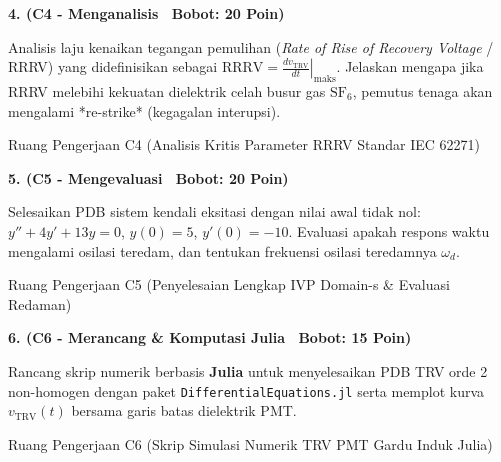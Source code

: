 \documentclass[10pt,a4paper]{article}
\begin{document}
\noindent\textbf{4. (C4 - Menganalisis \textbar\ Bobot: 20 Poin)}\par\vspace{0.5mm}
{\footnotesize Analisis laju kenaikan tegangan pemulihan (\textit{Rate of Rise of Recovery Voltage} / RRRV) yang didefinisikan sebagai $\text{RRRV} = \left. \frac{dv_{\text{TRV}}}{dt} \right|_{\text{maks}}$. Jelaskan mengapa jika RRRV melebihi kekuatan dielektrik celah busur gas $\text{SF}_6$, pemutus tenaga akan mengalami *re-strike* (kegagalan interupsi).}
\begin{answerbox}{Ruang Pengerjaan C4 (Analisis Kritis Parameter RRRV Standar IEC 62271)}
  \vspace{3.8cm}
\end{answerbox}

\vspace{1.5mm}

\noindent\textbf{5. (C5 - Mengevaluasi \textbar\ Bobot: 20 Poin)}\par\vspace{0.5mm}
{\footnotesize Selesaikan PDB sistem kendali eksitasi dengan nilai awal tidak nol: $y'' + 4y' + 13y = 0$, $y(0) = 5$, $y'(0) = -10$. Evaluasi apakah respons waktu mengalami osilasi teredam, dan tentukan frekuensi osilasi teredamnya $\omega_d$.}
\begin{answerbox}{Ruang Pengerjaan C5 (Penyelesaian Lengkap IVP Domain-s \& Evaluasi Redaman)}
  \vspace{3.8cm}
\end{answerbox}

\vspace{1.5mm}

\noindent\textbf{6. (C6 - Merancang \& Komputasi Julia \textbar\ Bobot: 15 Poin)}\par\vspace{0.5mm}
{\footnotesize Rancang skrip numerik berbasis \textbf{Julia} untuk menyelesaikan PDB TRV orde 2 non-homogen dengan paket \texttt{Differential\-Equations.jl} serta memplot kurva $v_{\text{TRV}}(t)$ bersama garis batas dielektrik PMT.}
\begin{answerbox}{Ruang Pengerjaan C6 (Skrip Simulasi Numerik TRV PMT Gardu Induk Julia)}
  \vspace{3.8cm}
\end{answerbox}

\vspace{1.5mm}
\end{document}
